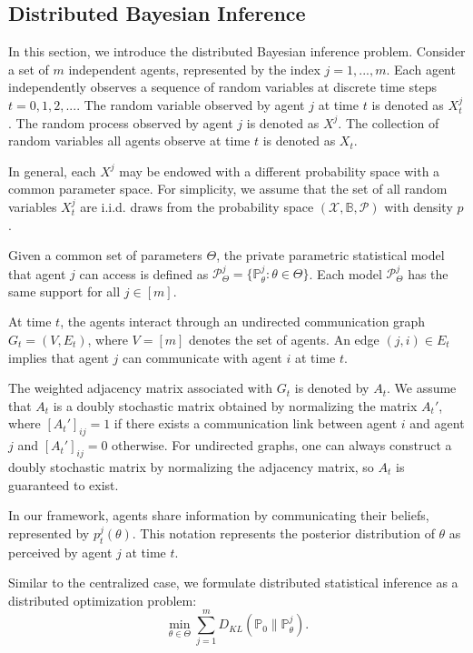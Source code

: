\documentclass[twoside,11pt]{article}
\numberwithin{equation}{section}
\renewcommand\P{\mathcal{P}}
\newcommand\bP{\mathbb{P}}
\begin{document}
\subsection{Distributed Bayesian Inference}
\label{subsect:distributed-Bayesian-inference}
In this section, we introduce the distributed Bayesian inference problem. Consider a set of $m$ independent agents, represented by the index $j = 1, ..., m$. Each agent independently observes a sequence of random variables at discrete time steps $t = 0,1, 2, ...$.  The random variable observed by agent $j$ at time $t$ is denoted as $X_t^j$. The random process observed by agent $j$ is denoted as $X^j$. The collection of random variables all agents observe at time $t$ is denoted as $X_t$. {In general, each $X^j$ may be endowed with a different probability space with a common parameter space. For simplicity, we assume that the set of all random variables ${X_t^j}$ are i.i.d. draws from the probability space $\left(\mathcal{X}, \mathbb{B}, \P\right)$ with density $p$.

Given a  common set of parameters $\Theta$, the private parametric statistical model that agent $j$ can access is defined as $\mathcal{P}_\Theta^j = \{\bP_\theta^j: \theta \in \Theta\}$. Each model $\mathcal{P}_\Theta^j$ has the same support for all $j \in [m]$. 

At time $t$, the agents interact through an undirected communication graph $G_t = (V, E_t)$, where $V = [m]$ denotes the set of agents. An edge $(j, i) \in E_t$ implies that agent $j$ can communicate with agent $i$ at time $t$. 



The weighted adjacency matrix associated with $G_t$ is denoted by $A_t$.  We assume that $A_t$ is a doubly stochastic matrix obtained by normalizing the matrix $A_t'$, where $[A_t']_{ij} = 1$ if there exists a communication link between agent $i$ and agent $j$ and $[A_t']_{ij} = 0$ otherwise. {For undirected graphs, one can always construct a doubly stochastic matrix by normalizing the adjacency matrix, so $A_t$ is guaranteed to exist. }

In our framework, agents share information by communicating their beliefs, represented by $p_t^j(\theta)$. This notation represents the posterior distribution of $\theta$ as perceived by agent $j$ at time $t$. 

Similar to the centralized case, we formulate distributed statistical inference as a distributed optimization problem:
\begin{equation}
\label{eqn: dKL}
\min_{\theta \in \Theta} \sum_{j = 1}^m D_{KL}(\bP_0\parallel \bP_\theta^j).
\end{equation}

}
\end{document}
